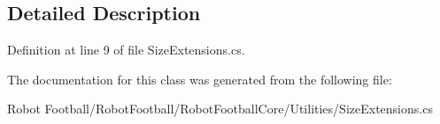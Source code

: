 \subsection{Detailed Description}


Definition at line 9 of file Size\-Extensions.\-cs.



The documentation for this class was generated from the following file\-:\begin{DoxyCompactItemize}
\item 
Robot Football/\-Robot\-Football/\-Robot\-Football\-Core/\-Utilities/Size\-Extensions.\-cs\end{DoxyCompactItemize}
